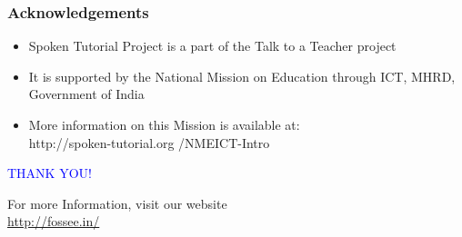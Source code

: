 \documentclass[17pt,compress]{beamer}
\begin{document}
\begin{frame}
\frametitle{Acknowledgements}
\begin{itemize}
\item Spoken Tutorial Project is a part of the Talk to a Teacher  project 
\item It is supported by the National Mission on Education through  ICT, MHRD, Government of India 
\item More information on this Mission is available at: \\{\color{blue}http://spoken-tutorial.org /NMEICT-Intro}
\end{itemize}
\end{frame}
\begin{frame}

  \begin{block}{}
  \begin{center}
  \textcolor{blue}{\Large THANK YOU!} 
  \end{center}
  \end{block}
\begin{block}{}
  \begin{center}
    For more Information, visit our website\\
    \url{http://fossee.in/}
  \end{center}  
  \end{block}
\end{frame}
\end{document}
